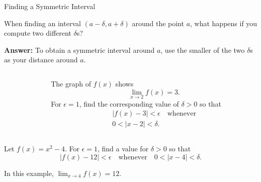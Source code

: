 \documentclass[Cal1Spr16Lectures.tex]{subfiles}
\begin{document}
\begin{frame}{\small Finding a Symmetric Interval}
\begin{que}When finding an interval $(a-\delta, a+\delta)$ around the point $a$, what happens if you compute two different $\delta$s?\end{que}  
{\bf Answer:}  To obtain a symmetric interval around $a$, use the smaller of the two $\delta$s as your distance around $a$.
\end{frame}

\begin{frame}\footnotesize
\begin{exe}
\vspace{0.75pc}
\begin{columns}[T]
	\begin{column}{.4\textwidth}
	\end{column}
	\begin{column}{.55\textwidth}
		The graph of $f(x)$ shows 
		\[\lim_{x \to 2}f(x)=3.\] 
		For $\epsilon=1$, find the corresponding value of $\delta>0$ so that
		\begin{multline*}|f(x)-3|<\epsilon\quad\text{whenever} \\
			0<|x-2|<\delta.\end{multline*}  
	\end{column}
\end{columns}
\end{exe}
\end{frame}

\begin{frame}{}
\begin{exe} Let $f(x)=x^2-4$.  For $\epsilon=1$, find a value for $\delta>0$ so that 
\[|f(x)-12|<\epsilon \quad \text{whenever}\quad 0<|x-4|<\delta.\]
\end{exe}
In this example,  $\lim_{x \to 4}f(x)=12.$  
\end{frame}
\end{document}
